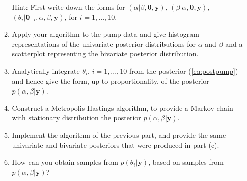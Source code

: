 \documentclass{article} %
\begin{document}
\begin{enumerate}
\begin{enumerate}
Hint: First write down the forms for $(\alpha|\beta,\boldsymbol{\theta},\mathbf{y})$, $(\beta|\alpha,\boldsymbol{\theta},\mathbf{y})$, $(\theta_i | \boldsymbol{\theta}_{-i},\alpha,\beta,\mathbf{y})$, for $i=1,...,10$.
\item Apply your algorithm to the pump data and give histogram
  representations of the univariate posterior distributions for
  $\alpha$ and $\beta$ and a scatterplot representing the bivariate
  posterior distribution.
\item Analytically integrate $\theta_i$, $i=1,...,10$ from the
  posterior (\ref{eq:postpump}) and hence give the form, up to
  proportionality, of the posterior $p(\alpha,\beta|\mathbf{y})$.
\item Construct a Metropolis-Hastings algorithm, to provide a Markov
  chain with stationary distribution the posterior
  $p(\alpha,\beta|\mathbf{y})$.
\item Implement the algorithm of the previous part, and provide the
  same univariate and bivariate posteriors that were produced in part (c).
\item How can you obtain samples from $p(\theta_i|\mathbf{y})$, based on samples from $p(\alpha,\beta|\mathbf{y})$?
\end{enumerate}



\end{enumerate}
\end{document}
